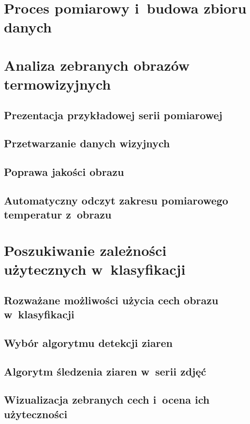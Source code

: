 \section{Proces pomiarowy i~budowa zbioru danych}

\section{Analiza zebranych obrazów termowizyjnych}

\subsection{Prezentacja przykładowej serii pomiarowej}

\subsection{Przetwarzanie danych wizyjnych}

\subsection{Poprawa jakości obrazu}

\subsection{Automatyczny odczyt zakresu pomiarowego temperatur z~obrazu}

\section{Poszukiwanie zależności użytecznych w~klasyfikacji}

\subsection{Rozważane możliwości użycia cech obrazu w~klasyfikacji}

\subsection{Wybór algorytmu detekcji ziaren}

\subsection{Algorytm śledzenia ziaren w~serii zdjęć}

\subsection{Wizualizacja zebranych cech i~ocena ich użyteczności}
